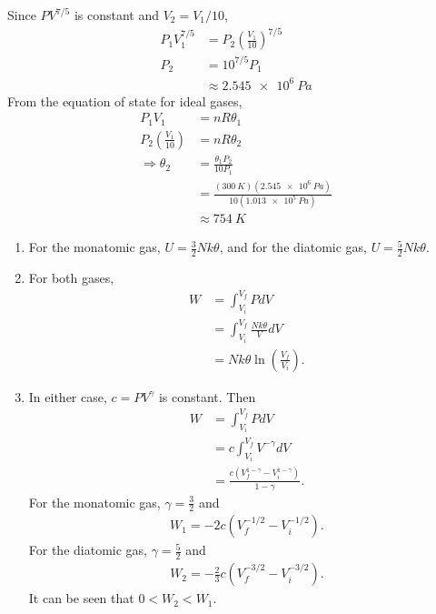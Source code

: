 \documentclass[a4paper,12pt]{article}
\begin{document}
\begin{enumerate}[label=\textbf{[\arabic*]}]
    \item
        Since $PV^{7/5}$ is constant and $V_2 = V_1 / 10$,
        \begin{align*}
            P_1 V_1^{7/5} &= P_2 \left( \frac{V_1}{10} \right)^{7/5} \\
            P_2 &= 10^{7/5} P_1 \\
            &\approx \SI{2.545e6}{Pa}
        \end{align*}
        From the equation of state for ideal gases,
        \begin{align*}
            P_1 V_1 &= nR \theta_1 \\
            P_2 \left( \frac{V_1}{10} \right) &= nR \theta_2 \\
            \Rightarrow \theta_2 &= \frac{\theta_1 P_2}{10 P_1} \\
            &= \frac{(\SI{300}{K}) (\SI{2.545e6}{Pa})}{10(\SI{1.013e5}{Pa})} \\
            &\approx \SI{754}{K}
        \end{align*}

    \item
        \begin{enumerate}
            \item
                For the monatomic gas, $U = \frac{3}{2}Nk\theta$, and for the diatomic gas, $U = \frac{5}{2}Nk\theta$.

            \item
                For both gases,
                \begin{align*}
                    W &= \int_{V_i}^{V_f} P dV \\
                    &= \int_{V_i}^{V_f} \frac{Nk\theta}{V} dV \\
                    &= Nk\theta \ln{\left( \frac{V_f}{V_i} \right)}.
                \end{align*}

            \item
                In either case, $c = PV^\gamma$ is constant. Then
                \begin{align*}
                    W &= \int_{V_i}^{V_f} P dV \\
                    &= c \int_{V_i}^{V_f} V^{-\gamma} dV \\
                    &= \frac{c (V_f^{1 - \gamma} - V_i^{1 - \gamma})}{1 - \gamma}.
                \end{align*}
                For the monatomic gas, $\gamma = \frac{3}{2}$ and
                \begin{align*}
                    W_1 = -2c(V_f^{-1/2} - V_i^{-1/2}).
                \end{align*}
                For the diatomic gas, $\gamma = \frac{5}{2}$ and
                \begin{align*}
                    W_2 = -\frac{2}{3} c(V_f^{-3/2} - V_i^{-3/2}).
                \end{align*}
                It can be seen that $0 < W_2 < W_1$.


\end{enumerate}
\end{enumerate}
\end{document}
